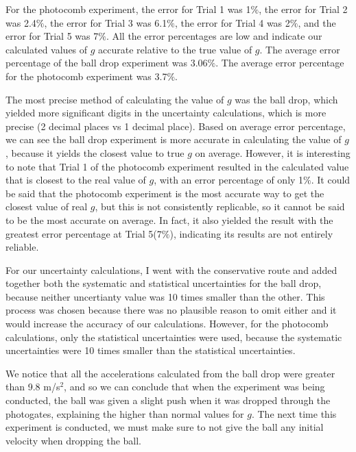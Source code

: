 \documentclass[11pt]{report}
\begin{document}
\setlength{\parindent}{5ex}
For the photocomb experiment, the error for Trial 1 was 1$\%$, the error for Trial 2 was
2.4$\%$, the error for Trial 3 was 6.1$\%$, the error for Trial 4 was 2$\%$, and
the error for Trial 5 was 7$\%$.  All the error percentages are low and indicate
our calculated values of \(g\) accurate relative to the true value of \(g\).
The average error percentage of the ball drop experiment was 3.06$\%$.  The
average error percentage for the photocomb experiment was 3.7$\%$.  

The most precise method of calculating the value of \(g\) was the ball drop,
which yielded more significant digits in the uncertainty calculations, which is
more precise (2 decimal places vs 1 decimal place).  
Based on average error percentage, we can see the ball 
drop experiment is more accurate in calculating the value of \(g\), because it
yields the closest value to true \(g\) on average.  However, it is interesting
to note that Trial 1 of the photocomb experiment resulted in the calculated value
that is closest to the real value of \(g\), with an error percentage of only 1$\%$. 
It could be said that the photocomb experiment is the most accurate way to get the closest
value of real \(g\), but this is not consistently replicable, so it cannot be said to
be the most accurate on average.  In fact, it also yielded the result with the greatest
error percentage at Trial 5(7$\%$), indicating its results are not entirely
reliable.  

For our uncertainty calculations, I went with the conservative route and added
together both the systematic and statistical uncertainties for the ball drop, 
because neither uncertianty value was 10 times smaller than the other.  This
process was chosen because there was no plausible reason to omit either and it
would increase the accuracy of our calculations. However, for the photocomb 
calculations, only the statistical uncertainties were used, because the 
systematic uncertainties were 10 times smaller than the statistical uncertainties.  

We notice that all the accelerations calculated from the ball drop were greater
than 9.8 m/s$^2$, and so we can conclude that when the experiment was being
conducted, the ball was given a slight push when it was dropped through the
photogates, explaining the higher than normal values for \(g\).  The next time
this experiment is conducted, we must make sure to not give the ball any
initial velocity when dropping the ball.
\end{document}
